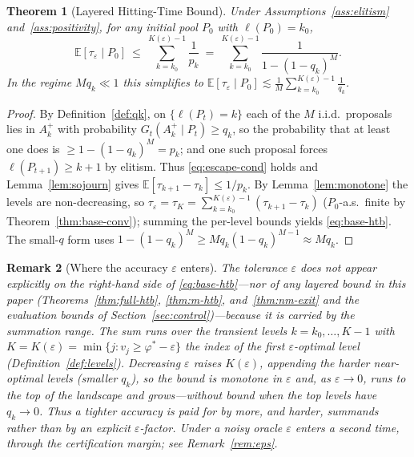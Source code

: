 \documentclass[11pt,a4paper]{article}
\newtheorem{theorem}{Theorem}[section]
\newtheorem{remark}[theorem]{Remark}
\newcommand{\E}{\mathbb{E}}
\newcommand{\phist}{\varphi^*}
\newcommand{\Akp}{A_k^{+}}
\begin{document}
\begin{theorem}[Layered Hitting-Time Bound]\label{thm:base-htb}
  Under Assumptions~\ref{ass:elitism} and~\ref{ass:positivity}, for any
  initial pool $P_0$ with $\ell(P_0)=k_0$,
  \begin{equation}
    \E[\tau_\varepsilon\mid P_0]
    \ \le\ \sum_{k=k_0}^{K(\varepsilon)-1}\frac1{p_k}
    \ =\ \sum_{k=k_0}^{K(\varepsilon)-1}\frac1{1-(1-q_k)^M}.
    \label{eq:base-htb}
  \end{equation}
  In the regime $Mq_k\ll1$ this simplifies to
  $\E[\tau_\varepsilon\mid P_0]\lesssim
  \frac1M\sum_{k=k_0}^{K(\varepsilon)-1}\frac1{q_k}$.
\end{theorem}

\begin{proof}
  By Definition~\ref{def:qk}, on $\{\ell(P_t)=k\}$ each of the $M$
  i.i.d.\ proposals lies in $\Akp$ with probability
  $G_t(\Akp\mid P_t)\ge q_k$, so the probability that at least one does
  is $\ge1-(1-q_k)^M=p_k$; and one such proposal forces
  $\ell(P_{t+1})\ge k+1$ by elitism.  Thus \eqref{eq:escape-cond} holds
  and Lemma~\ref{lem:sojourn} gives
  $\E[\tau_{k+1}-\tau_k]\le1/p_k$.  By Lemma~\ref{lem:monotone} the
  levels are non-decreasing, so
  $\tau_\varepsilon=\tau_K=\sum_{k=k_0}^{K(\varepsilon)-1}(\tau_{k+1}-\tau_k)$
  ($P_0$-a.s.\ finite by Theorem~\ref{thm:base-conv}); summing the
  per-level bounds yields \eqref{eq:base-htb}.  The small-$q$ form uses
  $1-(1-q_k)^M\ge Mq_k(1-q_k)^{M-1}\approx Mq_k$.
\end{proof}

\begin{remark}[Where the accuracy $\varepsilon$ enters]\label{rem:eps-levels}
  The tolerance $\varepsilon$ does not appear explicitly on the right-hand
  side of \eqref{eq:base-htb}---nor of any layered bound in this paper
  (Theorems~\ref{thm:full-htb}, \ref{thm:m-htb}, and~\ref{thm:nm-exit}
  and the evaluation bounds of Section~\ref{sec:control})---because it is
  carried by the \emph{summation range}.  The sum runs over the transient
  levels $k=k_0,\dots,K-1$ with
  $K=K(\varepsilon)=\min\{j:v_j\ge\phist-\varepsilon\}$ the index of the
  first $\varepsilon$-optimal level (Definition~\ref{def:levels}).
  Decreasing $\varepsilon$ raises $K(\varepsilon)$, \emph{appending} the
  harder near-optimal levels (smaller $q_k$), so the bound is monotone in
  $\varepsilon$ and, as $\varepsilon\to0$, runs to the top of the landscape
  and grows---without bound when the top levels have $q_k\to0$.  Thus a
  tighter accuracy is paid for by more, and harder, summands rather than by
  an explicit $\varepsilon$-factor.  Under a noisy oracle $\varepsilon$
  enters a second time, through the certification margin; see
  Remark~\ref{rem:eps}.
\end{remark}
\end{document}
